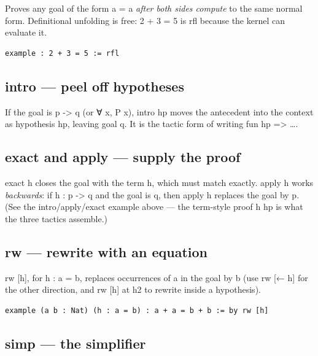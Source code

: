 \documentclass[12pt, openany]{book}
\theoremstyle{plain}
\theoremstyle{definition}
\theoremstyle{remark}
\newcommand{\li}[1]{{\ttfamily\small\color{tealaccent}#1}}
\begin{document}
Proves any goal of the form \li{a = a} \emph{after both sides compute} to the same normal form.  Definitional unfolding is free: \li{2 + 3 = 5} is \li{rfl} because the kernel can evaluate it.

\begin{leanbox}
\begin{lstlisting}
example : 2 + 3 = 5 := rfl
\end{lstlisting}
\end{leanbox}
\color{black}

\subsection*{\li{intro} --- peel off hypotheses}

If the goal is \li{p -> q} (or \li{∀ x, P x}), \li{intro hp} moves the antecedent into the context as hypothesis \li{hp}, leaving goal \li{q}.  It is the tactic form of writing \li{fun hp => \ldots}.

\subsection*{\li{exact} and \li{apply} --- supply the proof}

\li{exact h} closes the goal with the term \li{h}, which must match exactly.  \li{apply h} works \emph{backwards}: if \li{h : p -> q} and the goal is \li{q}, then \li{apply h} replaces the goal by \li{p}.  (See the \li{intro}/\li{apply}/\li{exact} example above --- the term-style proof \li{h hp} is what the three tactics assemble.)

\subsection*{\li{rw} --- rewrite with an equation}

\li{rw [h]}, for \li{h : a = b}, replaces occurrences of \li{a} in the goal by \li{b} (use \li{rw [← h]} for the other direction, and \li{rw [h] at h2} to rewrite inside a hypothesis).

\begin{leanbox}
\begin{lstlisting}
example (a b : Nat) (h : a = b) : a + a = b + b := by rw [h]
\end{lstlisting}
\end{leanbox}
\color{black}

\subsection*{\li{simp} --- the simplifier}
\end{document}
